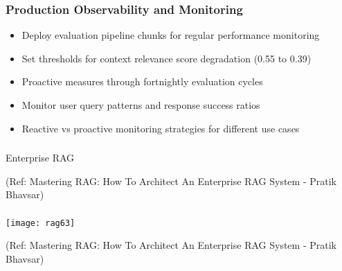 \begin{frame}[fragile]\frametitle{Production Observability and Monitoring}
      \begin{itemize}
	\item Deploy evaluation pipeline chunks for regular performance monitoring
	\item Set thresholds for context relevance score degradation (0.55 to 0.39)
	\item Proactive measures through fortnightly evaluation cycles
	\item Monitor user query patterns and response success ratios
	\item Reactive vs proactive monitoring strategies for different use cases
	  \end{itemize}
\end{frame}

\begin{frame}[fragile]\frametitle{}
\begin{center}
{\Large Enterprise RAG}

{\tiny (Ref: Mastering RAG: How To Architect An Enterprise RAG System - Pratik Bhavsar)}

\end{center}
\end{frame}

\begin{frame}[fragile]\frametitle{}

	\begin{center}
	\texttt{[image: rag63]}
	
	{\tiny (Ref: Mastering RAG: How To Architect An Enterprise RAG System - Pratik Bhavsar)}
	
	\end{center}
	
	
\end{frame}


